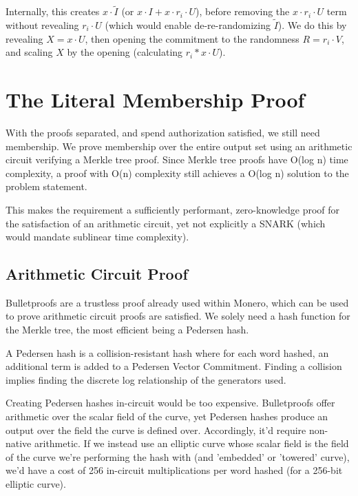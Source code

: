 \documentclass[]{article}
\begin{document}
Internally, this creates $x \cdot \tilde{I}$ (or $x \cdot I + x \cdot r_i \cdot U$), before removing the $x \cdot r_i \cdot U$ term without revealing $r_i \cdot U$ (which would enable de-re-randomizing $\tilde{I}$). We do this by revealing $X = x \cdot U$, then opening the commitment to the randomness $R = r_i \cdot V$, and scaling $X$ by the opening (calculating $r_i * x \cdot U$).

\newpage

\section{The Literal Membership Proof}

With the proofs separated, and spend authorization satisfied, we still need membership. We prove membership over the entire output set using an arithmetic circuit verifying a Merkle tree proof. Since Merkle tree proofs have O(log n) time complexity, a proof with O(n) complexity still achieves a O(log n) solution to the problem statement.

This makes the requirement a sufficiently performant, zero-knowledge proof for the satisfaction of an arithmetic circuit, yet not explicitly a SNARK (which would mandate sublinear time complexity).

\subsection{Arithmetic Circuit Proof}

Bulletproofs are a trustless proof already used within Monero, which can be used to prove arithmetic circuit proofs are satisfied. We solely need a hash function for the Merkle tree, the most efficient being a Pedersen hash.

A Pedersen hash is a collision-resistant hash where for each word hashed, an additional term is added to a Pedersen Vector Commitment. Finding a collision implies finding the discrete log relationship of the generators used.

Creating Pedersen hashes in-circuit would be too expensive. Bulletproofs offer arithmetic over the scalar field of the curve, yet Pedersen hashes produce an output over the field the curve is defined over. Accordingly, it'd require non-native arithmetic. If we instead use an elliptic curve whose scalar field is the field of the curve we're performing the hash with (and 'embedded' or 'towered' curve), we'd have a cost of 256 in-circuit multiplications per word hashed (for a 256-bit elliptic curve).
\end{document}
